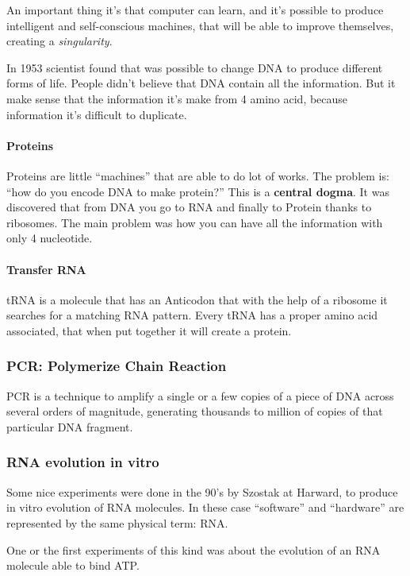 An important thing it's that computer can learn, and it's possible to produce
intelligent and self-conscious machines, that will be able to improve
themselves, creating a \textit{singularity}.

In 1953 scientist found that was possible to change DNA to produce different
forms of life. People didn't believe that DNA contain all the information.
But it make sense that the information it's make from 4 amino acid, because
information it's difficult to duplicate.

\paragraph*{Proteins} Proteins are little ``machines'' that are able to do lot
of works. The problem is: ``how do you encode DNA to make protein?'' This is a
\textbf{central dogma}. It was discovered that from DNA you go to RNA and
finally to Protein thanks to ribosomes.
The main problem was how you can have all the information with only
4 nucleotide.

\paragraph*{Transfer RNA} tRNA is a molecule that has an Anticodon that with
the help of a ribosome it searches for a matching RNA pattern. Every tRNA has a
proper amino acid associated, that when put together it will create a protein.

\subsubsection{PCR: Polymerize Chain Reaction}
PCR is a technique to amplify a single or a few copies of a piece of DNA across
several orders of magnitude, generating thousands to million of copies of that
particular DNA fragment.

\subsubsection{RNA evolution in vitro}
Some nice experiments were done in the 90's by Szostak at Harward, to produce
in vitro evolution of RNA molecules. In these case ``software'' and ``hardware''
are represented by the same physical term: RNA.

One or the first experiments of this kind was about the evolution of an RNA
molecule able to bind ATP.

